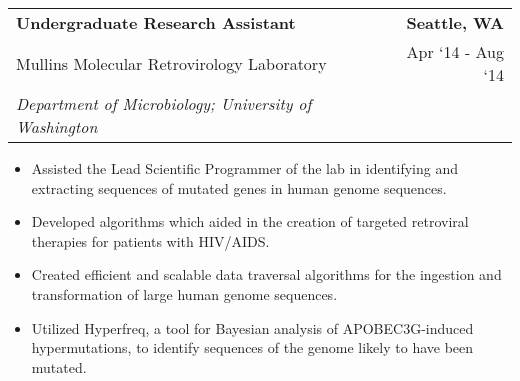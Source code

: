 \documentclass[10pt, letterpaper]{article}
\newcommand{\tabularxwidth}{\textwidth}
\begin{document}
    \begin{minipage}{\tabularxwidth}

        \begin{tabularx}{\tabularxwidth}{X r}
            \textbf{Undergraduate Research Assistant} & \textbf{Seattle, 
        WA} \\
            Mullins Molecular Retrovirology Laboratory & 
        
    Apr ‘14 - 
    Aug ‘14 \\
            
                
                    \textit{Department of Microbiology; University of Washington} & \\
                
            
            
        \end{tabularx}

        \begin{itemize}[noitemsep, topsep=3pt, parsep=0pt, partopsep=0pt]
            
                \item 
    Assisted the Lead Scientific Programmer of the lab in identifying and extracting sequences of mutated genes in human genome sequences.
            
                \item 
    Developed algorithms which aided in the creation of targeted retroviral therapies for patients with HIV/AIDS.
            
                \item 
    Created efficient and scalable data traversal algorithms for the ingestion and transformation of large human genome sequences.
            
                \item 
    Utilized Hyperfreq, a tool for Bayesian analysis of APOBEC3G-induced hypermutations, to identify sequences of the genome likely to have been mutated.
            
        \end{itemize}

        

    \end{minipage}
    
\end{document}
